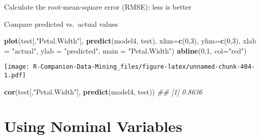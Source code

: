 \documentclass[
  notitlepage]{book}
\newenvironment{Shaded}{\begin{snugshade}}{\end{snugshade}}
\newcommand{\CommentTok}[1]{\textcolor[rgb]{0.56,0.35,0.01}{\textit{#1}}}
\newcommand{\ControlFlowTok}[1]{\textcolor[rgb]{0.13,0.29,0.53}{\textbf{#1}}}
\newcommand{\DataTypeTok}[1]{\textcolor[rgb]{0.13,0.29,0.53}{#1}}
\newcommand{\DecValTok}[1]{\textcolor[rgb]{0.00,0.00,0.81}{#1}}
\newcommand{\KeywordTok}[1]{\textcolor[rgb]{0.13,0.29,0.53}{\textbf{#1}}}
\newcommand{\NormalTok}[1]{#1}
\newcommand{\OperatorTok}[1]{\textcolor[rgb]{0.81,0.36,0.00}{\textbf{#1}}}
\newcommand{\StringTok}[1]{\textcolor[rgb]{0.31,0.60,0.02}{#1}}
\begin{document}
Calculate the root-mean-square error (RMSE): less is better

\begin{Shaded}
\end{Shaded}

Compare predicted vs.~actual values

\begin{Shaded}
\begin{Highlighting}[]
\KeywordTok{plot}\NormalTok{(test[,}\StringTok{"Petal.Width"}\NormalTok{], }\KeywordTok{predict}\NormalTok{(model4, test),}
  \DataTypeTok{xlim=}\KeywordTok{c}\NormalTok{(}\DecValTok{0}\NormalTok{,}\DecValTok{3}\NormalTok{), }\DataTypeTok{ylim=}\KeywordTok{c}\NormalTok{(}\DecValTok{0}\NormalTok{,}\DecValTok{3}\NormalTok{), }
  \DataTypeTok{xlab =} \StringTok{"actual"}\NormalTok{, }\DataTypeTok{ylab =} \StringTok{"predicted"}\NormalTok{,}
  \DataTypeTok{main =} \StringTok{"Petal.Width"}\NormalTok{)}
\KeywordTok{abline}\NormalTok{(}\DecValTok{0}\NormalTok{,}\DecValTok{1}\NormalTok{, }\DataTypeTok{col=}\StringTok{"red"}\NormalTok{)}
\end{Highlighting}
\end{Shaded}

\texttt{[image: R-Companion-Data-Mining\_files/figure-latex/unnamed-chunk-404-1.pdf]}

\begin{Shaded}
\begin{Highlighting}[]
\KeywordTok{cor}\NormalTok{(test[,}\StringTok{"Petal.Width"}\NormalTok{], }\KeywordTok{predict}\NormalTok{(model4, test))}
\CommentTok{\#\# [1] 0.8636}
\end{Highlighting}
\end{Shaded}

\hypertarget{using-nominal-variables}{%
\section{Using Nominal Variables}\label{using-nominal-variables}}
\end{document}
